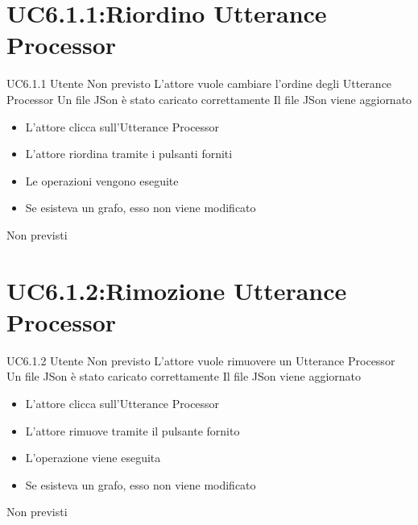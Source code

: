 \documentclass[../AnalisideiRequisiti.tex]{subfiles}
\begin{document}
\section{UC6.1.1:Riordino Utterance Processor}
\UserCase
{UC6.1.1}
{Utente}
{Non previsto}
{L'attore vuole cambiare l'ordine degli Utterance Processor}
{Un file JSon è stato caricato  correttamente }
{Il file JSon viene aggiornato}
{
	\begin{itemize}
		\item{} L'attore clicca sull'Utterance Processor 
		\item{} L'attore riordina tramite i pulsanti forniti	
		\item{} Le operazioni vengono eseguite
		\item{} Se esisteva un grafo, esso non viene modificato
		
	\end{itemize}
}
{Non previsti}

\section{UC6.1.2:Rimozione Utterance Processor}
\UserCase
{UC6.1.2}
{Utente}
{Non previsto}
{L'attore vuole rimuovere un Utterance Processor}
{Un file JSon è stato caricato  correttamente }
{Il file JSon viene aggiornato}
{
	\begin{itemize}
		\item{} L'attore clicca sull'Utterance Processor 
		\item{} L'attore rimuove tramite il pulsante fornito	
		\item{} L'operazione viene eseguita
		\item{} Se esisteva un grafo, esso non viene modificato
		
	\end{itemize}
}
{Non previsti}
\end{document}
